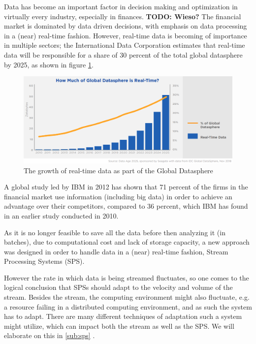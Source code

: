 Data has become an important factor in decision making and optimization in virtually every industry, especially in finances. \textbf{TODO: Wieso?}
The financial market is dominated by data driven decisions, with emphasis on data processing in a (near) real-time fashion.
However, real-time data is becoming of importance in multiple sectors; the International Data Corporation estimates that real-time data will be 
responsible for a share of 30 percent of the total global datasphere by 2025, as shown in figure \ref{fig:growth_realtime_data}.
\begin{figure}[h]
\centering
\includegraphics[width=1.0\textwidth]{Bilder/realtime_data.png}
\caption{The growth of real-time data as part of the Global Datasphere \cite[p.13]{idc-seagate-data}}
\label{fig:growth_realtime_data}
\end{figure}

A global study led by IBM in 2012 has shown that 71 percent of the firms in the financial market use information (including big data)
in order to achieve an advantage over their competitors, compared to 36 percent, which IBM has found in an earlier study conducted in 2010. \cite[p.1]{ibm-financial}

As it is no longer feasible to save all the data before then analyzing it (in batches), due to computational cost and lack of storage capacity, 
a new approach was designed in order to handle data in a (near) real-time fashion, Stream Processing Systems (SPS).

However the rate in which data is being streamed fluctuates, so one comes to the logical conclusion that SPSs should adapt to the velocity and volume of the stream.
Besides the stream, the computing environment might also fluctuate, e.g. a resource failing in a distributed computing environment, 
and as such the system has to adapt. There are many different techniques of adaptation such a system might utilize, 
which can impact both the stream as well as the SPS. We will elaborate on this in \ref{sub:sps} .


